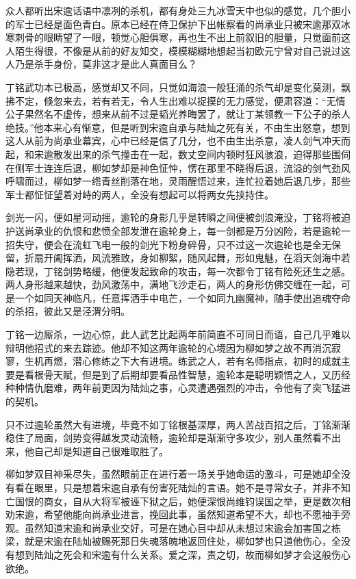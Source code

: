 众人都听出宋逾话语中凛冽的杀机，都有身处三九冰雪天中也似的感觉，几个胆小的军士已经是面色青白。原本已经在侍卫保护下出帐察看的尚承业只被宋逾那双冰寒刺骨的眼睛望了一眼，顿觉心胆俱寒，再也生不出上前叙旧的胆量，只觉面前这人陌生得很，不像是从前的好友知交，模模糊糊地想起当初欧元宁曾对自己说过这人乃是杀手身份，莫非这才是此人真面目么？

丁铭武功本已极高，感觉却又不同，只觉如海浪一般狂涌的杀气却是变化莫测，飘拂不定，倏忽来去，若有若无，令人生出难以捉摸的无力感觉，便肃容道：“无情公子果然名不虚传，想来从前不过是韬光养晦罢了，就让丁某领教一下公子的杀人绝技。”他本来心有惭意，但是听到宋逾自承与陆灿之死有关，不由生出怒意，想到这人从前为尚承业幕宾，心中已经是信了几分，也不由生出杀意，凌人剑气冲天而起，和宋逾散发出来的杀气撞击在一起，数丈空间内顿时狂风骇浪，迫得那些围伺在侧军士连连后退，柳如梦却是神色怔忡，愣在那里不晓得后退，流溢的剑气劲风呼啸而过，柳如梦一绺青丝削落在地，灵雨醒悟过来，连忙拉着她后退几步，那些军士都怔怔望着对峙的两人，全没有想起可以将两女先挟持住。

剑光一闪，便如星河动摇，逾轮的身影几乎是转瞬之间便被剑浪淹没，丁铭将被迫护送尚承业的仇恨和悲愤全部发泄在逾轮身上，每一剑都是万分凶险，若是逾轮一招失守，便会在流虹飞电一般的剑光下粉身碎骨，只不过这一次逾轮也是全无保留，折扇开阖挥洒，风流雅致，身如柳絮，随风起舞，形如鬼魅，在滔天剑海中若隐若现，丁铭剑势略缓，他便发起致命的攻击，每一次都令丁铭有险死还生之感。两人身形越来越快，劲风激荡中，满地飞沙走石，两人的身形仿佛交缠在一起，可是一个如同天神临凡，任意挥洒手中电芒，一个如同九幽魔神，随手使出追魂夺命的杀招，彼此又是泾渭分明。

丁铭一边厮杀，一边心惊，此人武艺比起两年前简直不可同日而语，自己几乎难以辩明他招式的来去踪迹。他却不知这两年逾轮的心境因为柳如梦之故不再消沉寂寥，生机再燃，潜心修练之下大有进境。练武之人，若有名师指点，初时的成就主要是看根骨天赋，但是到了后期却要看品性智慧，逾轮本是聪明颖悟之人，又历经种种情仇磨难，两年前更因为陆灿之事，心灵遭遇强烈的冲击，令他有了突飞猛进的契机。

只不过逾轮虽然大有进境，毕竟不如丁铭根基深厚，两人苦战百招之后，丁铭渐渐稳住了局面，剑势变得越发灵动流畅，逾轮却是渐渐守多攻少，别人虽然看不出来，他自己却是知道自己很难取胜了。

柳如梦双目神采尽失，虽然眼前正在进行着一场关乎她命运的激斗，可是她却全没有看在眼里，只是想着宋逾自承有份害死陆灿的言语。她不是寻常女子，并非不知亡国恨的商女，自从大将军被诬下狱之后，她便深恨尚维钧误国之举，更是数次相劝宋逾，希望他能向尚承业进言，挽回此事，虽然知道希望不大，却也不愿袖手旁观。虽然知道宋逾和尚承业交好，可是在她心目中却从未想过宋逾会加害国之栋梁，就是宋逾在陆灿被赐死那日失魂落魄地返回住处，柳如梦也只道他伤心，全没有想到陆灿之死会和宋逾有什么关系。爱之深，责之切，故而柳如梦才会这般伤心欲绝。

